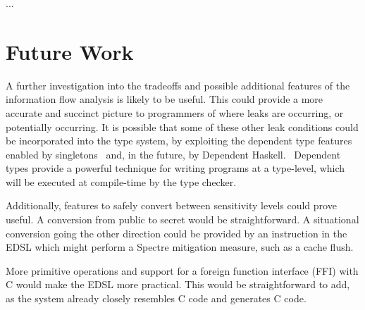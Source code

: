 \documentclass[10pt, conference]{IEEEtran}
\newcommand{\ttt}{\texttt}
\newcommand{\sarr}{\leadsto}
\begin{document}
...


\section{Future Work}
A further investigation into the tradeoffs and possible additional features of
the information flow analysis is likely to be useful. This could provide a more
accurate and succinct picture to programmers of where leaks are occurring, or
potentially occurring. It is possible that some of these other leak conditions
could be incorporated into the type system, by exploiting the dependent type
features enabled by singletons~\cite{SingletonsPaper} and, in the future, by Dependent Haskell.~\cite{DepHaskSpec}
Dependent types provide a powerful technique for writing programs at a type-level, which
will be executed at compile-time by the type checker.~\cite{CertProg}

Additionally, features to safely convert between sensitivity levels could prove
useful. A conversion from public to secret would be straightforward. A situational conversion
going the other direction could be provided by an instruction in the EDSL
which might perform a Spectre mitigation measure, such as a cache flush. \cite{PLtea-james}

More primitive operations and support for a foreign function interface (FFI)
with C would make the EDSL more practical. This would be straightforward to add,
as the system already closely resembles C code and generates C code.
\end{document}
